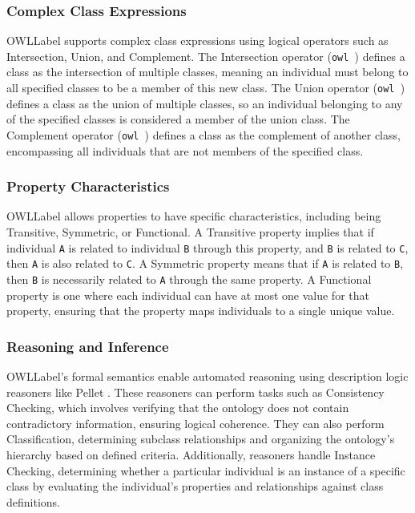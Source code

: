\subsubsection{Complex Class Expressions}\label{II-subsubsec:classExpression}

\acrshort{OWLLabel} supports complex class expressions using logical operators such as Intersection, Union, and Complement. The Intersection operator (\texttt{owl
}) defines a class as the intersection of multiple classes, meaning an individual must belong to all specified classes to be a member of this new class. The Union operator (\texttt{owl
}) defines a class as the union of multiple classes, so an individual belonging to any of the specified classes is considered a member of the union class. The Complement operator (\texttt{owl
}) defines a class as the complement of another class, encompassing all individuals that are not members of the specified class.

\subsubsection{Property Characteristics}\label{II-subsubsec:properyCharachteristics}

\acrshort{OWLLabel} allows properties to have specific characteristics, including being Transitive, Symmetric, or Functional. A Transitive property implies that if individual \texttt{A} is related to individual \texttt{B} through this property, and \texttt{B} is related to \texttt{C}, then \texttt{A} is also related to \texttt{C}. A Symmetric property means that if \texttt{A} is related to \texttt{B}, then \texttt{B} is necessarily related to \texttt{A} through the same property. A Functional property is one where each individual can have at most one value for that property, ensuring that the property maps individuals to a single unique value.

\subsubsection{Reasoning and Inference}\label{II-subsubsec:reasoning}

\acrshort{OWLLabel}'s formal semantics enable automated reasoning using description logic reasoners like Pellet \cite{sirinPelletPracticalOWLDL2007}. These reasoners can perform tasks such as Consistency Checking, which involves verifying that the ontology does not contain contradictory information, ensuring logical coherence. They can also perform Classification, determining subclass relationships and organizing the ontology's hierarchy based on defined criteria. Additionally, reasoners handle Instance Checking, determining whether a particular individual is an instance of a specific class by evaluating the individual's properties and relationships against class definitions.


